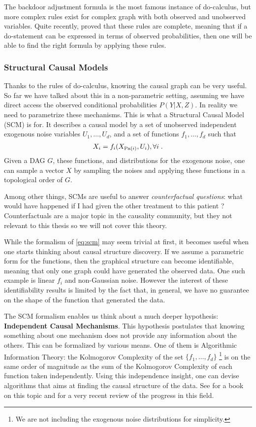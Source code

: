 The backdoor adjustment formula is the most famous instance of do-calculus, but more complex rules exist for complex graph with both observed and unobserved variables. Quite recently, \citet{huang2012pearl} proved that these rules are complete, meaning that if a do-statement can be expressed in terms of observed probabilities, then one will be able to find the right formula by applying these rules. 


\subsubsection{Structural Causal Models}

Thanks to the rules of do-calculus, knowing the causal graph can be very useful. So far we have talked about this in a non-parametric setting, assuming we have direct access the observed conditional probabilities $P(Y|X, Z)$. In reality we need to parametrize these mechanisms. This is what a Structural Causal Model (SCM) is for. It describes a causal model by a set of unobserved independent exogenous noise variables $U_1, \dots, U_d$, and a set of functions $f_1, \dots, f_d$ such that
\begin{align}
    X_i = f_i(X_{\operatorname{\mathrm{Pa}}(i)}, U_i), \forall i \;.
    \label{eq:scm}
\end{align}
Given a DAG $G$, these functions, and distributions for the exogenous noise, one can sample a vector $X$ by sampling the noises and applying these functions in a topological order of $G$.

Among other things, SCMs are useful to answer \textit{counterfactual questions}: what would have happened if I had given the other treatment to this patient ?  Counterfactuals are a major topic in the causality community, but they not relevant to this thesis so we will not cover this theory.

While the formalism of \eqref{eq:scm} may seem trivial at first, it becomes useful when one starts thinking about causal structure discovery. 
If we assume a parametric form for the functions, then the graphical structure can become identifiable, meaning that only one graph could have generated the observed data. One such example is linear $f_i$ and non-Gaussian noise. 
However the interest of these identifiability results is limited by the fact that, in general, we have no guarantee on the shape of the function that generated the data. 

The SCM formalism enables us think about a much deeper hypothesis: \textbf{Independent Causal Mechanisms}. This hypothesis postulates that knowing something about one mechanism does not provide any information about the others. This can be formalized by various means. One of them is Algorithmic Information Theory: the Kolmogorov Complexity of the set $\{ f_1, \dots, f_d \}$
\footnote{We are not including the exogenous noise distributions for simplicity.}
is on the same order of magnitude as the sum of the Kolmogorov Complexity of each function taken independently. 
Using this independence insight, one can devise algorithms that aims at finding the causal structure of the data. See \citet{peters2017elements} for a book on this topic and \citet{scholkopf2019causality} for a very recent review of the progress in this field. 